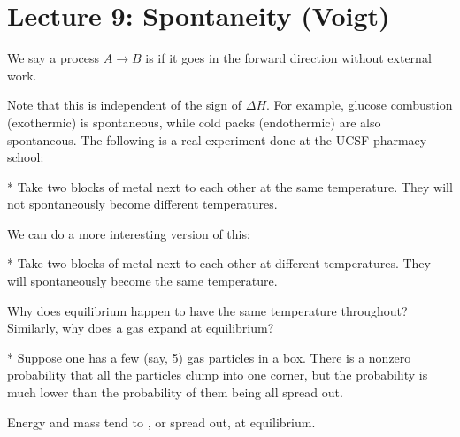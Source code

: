 \section*{Lecture 9: Spontaneity (Voigt)}
\setcounter{section}{9}
\setcounter{subsection}{0}
\setcounter{defn}{0}
\setcounter{defncontainer}{0}

\begin{defn}
	We say a process $A\to B$ is  if it goes in the forward direction without external work.
\end{defn}

Note that this is independent of the sign of $\Delta H$. For example, glucose combustion (exothermic) is spontaneous, while cold packs (endothermic) are also spontaneous.
The following is a real experiment done at the UCSF pharmacy school:

\begin{exper}*
	Take two blocks of metal next to each other at the same temperature.
	They will not spontaneously become different temperatures.
\end{exper}

We can do a more interesting version of this:

\begin{exper}*
	Take two blocks of metal next to each other at different temperatures.
	They will spontaneously become the same temperature.
\end{exper}

\begin{que}
	Why does equilibrium happen to have the same temperature throughout?
	Similarly, why does a gas expand at equilibrium?
\end{que}

\begin{fact}*
	Suppose one has a few (say, 5) gas particles in a box. There is a nonzero probability that all the particles clump into one corner, but the probability is much lower than the probability of them being all spread out.
\end{fact}

\begin{defn}
	Energy and mass tend to , or spread out, at equilibrium.
\end{defn}


